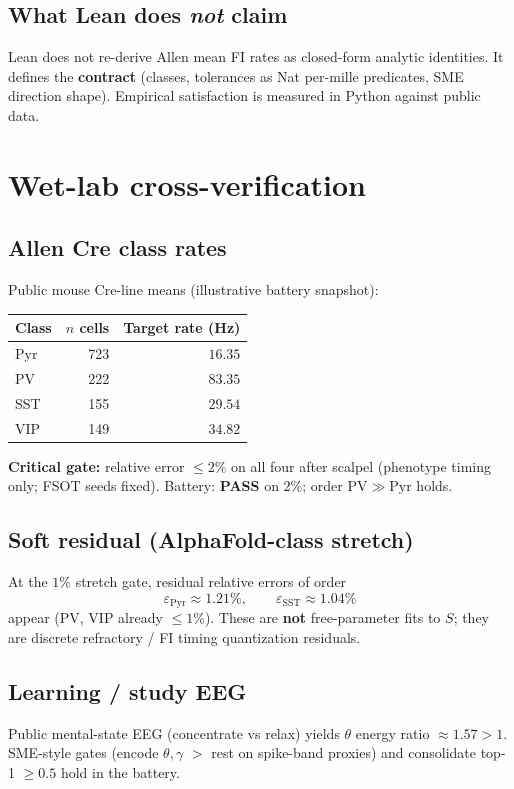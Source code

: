 \documentclass[11pt,a4paper]{article}
\begin{document}
\subsection{What Lean does \emph{not} claim}
Lean does not re-derive Allen mean FI rates as closed-form analytic identities.
It defines the \textbf{contract} (classes, tolerances as Nat per-mille predicates,
SME direction shape). Empirical satisfaction is measured in Python against public data.

\section{Wet-lab cross-verification}
\label{sec:wetlab}

\subsection{Allen Cre class rates}
Public mouse Cre-line means (illustrative battery snapshot):
\begin{center}
\begin{tabular}{lrr}
\toprule
Class & \(n\) cells & Target rate (Hz) \\
\midrule
Pyr & 723 & \(16.35\) \\
PV  & 222 & \(83.35\) \\
SST & 155 & \(29.54\) \\
VIP & 149 & \(34.82\) \\
\bottomrule
\end{tabular}
\end{center}
\textbf{Critical gate:} relative error \(\le 2\%\) on all four after scalpel
(phenotype timing only; FSOT seeds fixed). Battery: \textbf{PASS} on \(2\%\);
order \(\mathrm{PV}\gg\mathrm{Pyr}\) holds.

\subsection{Soft residual (AlphaFold-class stretch)}
At the \(1\%\) stretch gate, residual relative errors of order
\[
\varepsilon_{\mathrm{Pyr}}\approx 1.21\%,\qquad \varepsilon_{\mathrm{SST}}\approx 1.04\%
\]
appear (PV, VIP already \(\le 1\%\)). These are \textbf{not} free-parameter fits
to \(S\); they are discrete refractory / FI timing quantization residuals.

\subsection{Learning / study EEG}
Public mental-state EEG (concentrate vs relax) yields \(\theta\) energy ratio
\(\approx 1.57>1\). SME-style gates (encode \(\theta,\gamma\) \(>\) rest on
spike-band proxies) and consolidate top-1 \(\ge 0.5\) hold in the battery.
\end{document}
